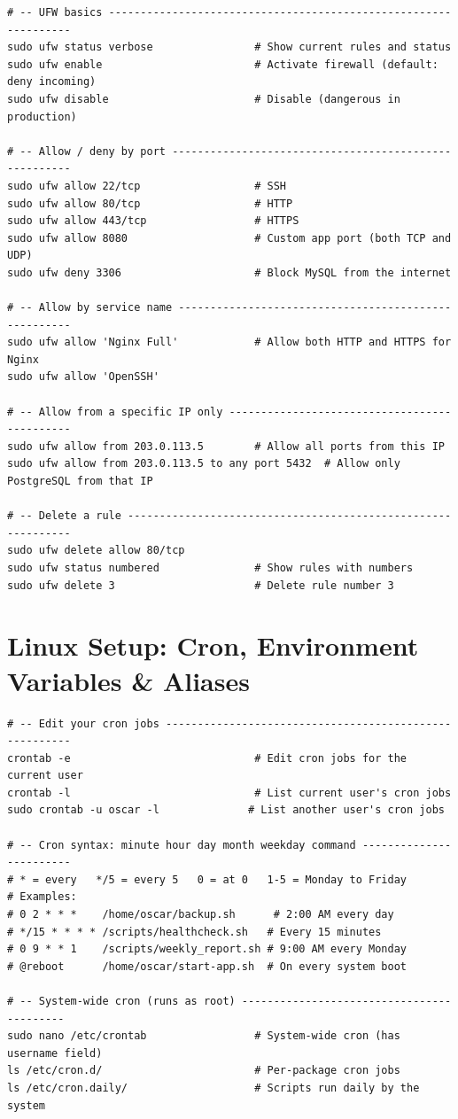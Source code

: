 \documentclass[11pt, letterpaper]{article}
\begin{document}
\begin{lstlisting}[style=shell, caption={UFW firewall (Uncomplicated Firewall)}]
# -- UFW basics ----------------------------------------------------------------
sudo ufw status verbose                # Show current rules and status
sudo ufw enable                        # Activate firewall (default: deny incoming)
sudo ufw disable                       # Disable (dangerous in production)

# -- Allow / deny by port ------------------------------------------------------
sudo ufw allow 22/tcp                  # SSH
sudo ufw allow 80/tcp                  # HTTP
sudo ufw allow 443/tcp                 # HTTPS
sudo ufw allow 8080                    # Custom app port (both TCP and UDP)
sudo ufw deny 3306                     # Block MySQL from the internet

# -- Allow by service name -----------------------------------------------------
sudo ufw allow 'Nginx Full'            # Allow both HTTP and HTTPS for Nginx
sudo ufw allow 'OpenSSH'

# -- Allow from a specific IP only ---------------------------------------------
sudo ufw allow from 203.0.113.5        # Allow all ports from this IP
sudo ufw allow from 203.0.113.5 to any port 5432  # Allow only PostgreSQL from that IP

# -- Delete a rule -------------------------------------------------------------
sudo ufw delete allow 80/tcp
sudo ufw status numbered               # Show rules with numbers
sudo ufw delete 3                      # Delete rule number 3
\end{lstlisting}

\section*{Linux Setup: Cron, Environment Variables \& Aliases}

\begin{lstlisting}[style=shell, caption={Cron jobs and scheduled tasks}]
# -- Edit your cron jobs -------------------------------------------------------
crontab -e                             # Edit cron jobs for the current user
crontab -l                             # List current user's cron jobs
sudo crontab -u oscar -l              # List another user's cron jobs

# -- Cron syntax: minute hour day month weekday command ------------------------
# * = every   */5 = every 5   0 = at 0   1-5 = Monday to Friday
# Examples:
# 0 2 * * *    /home/oscar/backup.sh      # 2:00 AM every day
# */15 * * * * /scripts/healthcheck.sh   # Every 15 minutes
# 0 9 * * 1    /scripts/weekly_report.sh # 9:00 AM every Monday
# @reboot      /home/oscar/start-app.sh  # On every system boot

# -- System-wide cron (runs as root) ------------------------------------------
sudo nano /etc/crontab                 # System-wide cron (has username field)
ls /etc/cron.d/                        # Per-package cron jobs
ls /etc/cron.daily/                    # Scripts run daily by the system
\end{lstlisting}
\end{document}
